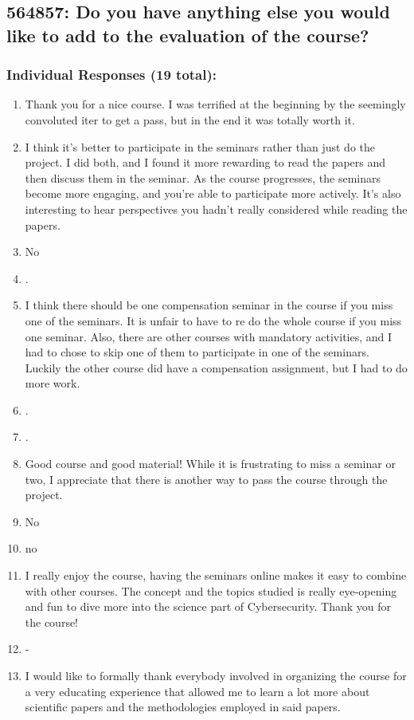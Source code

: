 \documentclass[a4paper]{report}
\begin{document}
\subsection{564857: Do you have anything else you would like to add to the evaluation of the course?}

\subsubsection{Individual Responses (19 total):}

\begin{enumerate}
  \item Thank you for a nice course. I was terrified at the beginning by the seemingly convoluted iter to get a pass, but in the end it was totally worth it.
  \item I think it's better to participate in the seminars rather than just do the project. I did both, and I found it more rewarding to read the papers and then discuss them in the seminar. As the course progresses, the seminars become more engaging, and you're able to participate more actively. It's also interesting to hear perspectives you hadn't really considered while reading the papers.
  \item No
  \item .
  \item I think there should be one compensation seminar in the course if you miss one of the seminars. It is unfair to have to re do the whole course if you miss one seminar. Also, there are other courses with mandatory activities, and I had to chose to skip one of them to participate in one of the seminars. Luckily the other course did have a compensation assignment, but I had to do more work.
  \item .
  \item .
  \item Good course and good material! While it is frustrating to miss a seminar or two, I appreciate that there is another way to pass the course through the project.
  \item No
  \item no
  \item I really enjoy the course, having the seminars online makes it easy to combine with other courses. The concept and the topics studied is really eye-opening and fun to dive more into the science part of Cybersecurity. Thank you for the course!
  \item -
  \item I would like to formally thank everybody involved in organizing the course for a very educating experience that allowed me to learn a lot more about scientific papers and the methodologies employed in said papers.

\end{enumerate}
\end{document}
